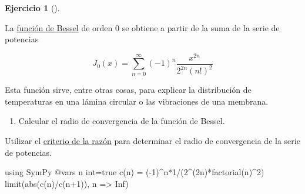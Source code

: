 \documentclass[
  a4paper,
]{scrreport}
\newenvironment{Shaded}{\begin{snugshade}}{\end{snugshade}}
\newcommand{\BuiltInTok}[1]{\textcolor[rgb]{0.00,0.23,0.31}{#1}}
\newcommand{\ConstantTok}[1]{\textcolor[rgb]{0.56,0.35,0.01}{#1}}
\newcommand{\FloatTok}[1]{\textcolor[rgb]{0.68,0.00,0.00}{#1}}
\newcommand{\FunctionTok}[1]{\textcolor[rgb]{0.28,0.35,0.67}{#1}}
\newcommand{\ImportTok}[1]{\textcolor[rgb]{0.00,0.46,0.62}{#1}}
\newcommand{\NormalTok}[1]{\textcolor[rgb]{0.00,0.23,0.31}{#1}}
\newcommand{\OperatorTok}[1]{\textcolor[rgb]{0.37,0.37,0.37}{#1}}
\newcommand{\PreprocessorTok}[1]{\textcolor[rgb]{0.68,0.00,0.00}{#1}}
\providecommand{\tightlist}{%
  \setlength{\itemsep}{0pt}\setlength{\parskip}{0pt}}\usepackage{longtable,booktabs,array}
\theoremstyle{definition}
\newtheorem{exercise}{Ejercicio}[chapter]
\theoremstyle{remark}
\begin{document}
\leavevmode{}%
\begin{exercise}[]\label{exr-serie-bessel}

La \href{https://es.wikipedia.org/wiki/Funci\%C3\%B3n_de_Bessel}{función
de Bessel} de orden 0 se obtiene a partir de la suma de la serie de
potencias

\[
J_0(x) = \sum_{n=0}^\infty (-1)^n\frac{x^{2n}}{2^{2n}(n!)^2}
\]

Esta función sirve, entre otras cosas, para explicar la distribución de
temperaturas en una lámina circular o las vibraciones de una membrana.

\begin{enumerate}
\def\labelenumi{\alph{enumi}.}
\tightlist
\item
  Calcular el radio de convergencia de la función de Bessel.
\end{enumerate}

\begin{tcolorbox}[enhanced jigsaw, toptitle=1mm, colframe=quarto-callout-note-color-frame, opacitybacktitle=0.6, colback=white, titlerule=0mm, toprule=.15mm, arc=.35mm, coltitle=black, colbacktitle=quarto-callout-note-color!10!white, bottomtitle=1mm, bottomrule=.15mm, title=\textcolor{quarto-callout-note-color}{\faInfo}\hspace{0.5em}{Ayuda}, rightrule=.15mm, opacityback=0, leftrule=.75mm, left=2mm, breakable]

Utilizar el
\href{https://aprendeconalf.es/analisis-manual/08-series.html\#thm-radio-convergencia-razon}{criterio
de la razón} para determinar el radio de convergencia de la serie de
potencias.

\end{tcolorbox}

\begin{tcolorbox}[enhanced jigsaw, toptitle=1mm, colframe=quarto-callout-tip-color-frame, opacitybacktitle=0.6, colback=white, titlerule=0mm, toprule=.15mm, arc=.35mm, coltitle=black, colbacktitle=quarto-callout-tip-color!10!white, bottomtitle=1mm, bottomrule=.15mm, title=\textcolor{quarto-callout-tip-color}{\faLightbulb}\hspace{0.5em}{Solución}, rightrule=.15mm, opacityback=0, leftrule=.75mm, left=2mm, breakable]

\begin{Shaded}
\begin{Highlighting}[]
\ImportTok{using} \BuiltInTok{SymPy}
\PreprocessorTok{@vars}\NormalTok{ n int}\OperatorTok{=}\ConstantTok{true}
\FunctionTok{c}\NormalTok{(n) }\OperatorTok{=}\NormalTok{ (}\OperatorTok{{-}}\FloatTok{1}\NormalTok{)}\OperatorTok{\^{}}\NormalTok{n}\OperatorTok{*}\FloatTok{1}\OperatorTok{/}\NormalTok{(}\FloatTok{2}\OperatorTok{\^{}}\NormalTok{(}\FloatTok{2}\NormalTok{n)}\FunctionTok{*factorial}\NormalTok{(n)}\OperatorTok{\^{}}\FloatTok{2}\NormalTok{)}
\FunctionTok{limit}\NormalTok{(}\FunctionTok{abs}\NormalTok{(}\FunctionTok{c}\NormalTok{(n)}\OperatorTok{/}\FunctionTok{c}\NormalTok{(n}\OperatorTok{+}\FloatTok{1}\NormalTok{)), n }\OperatorTok{=\textgreater{}} \ConstantTok{Inf}\NormalTok{)}
\end{Highlighting}
\end{Shaded}


\end{tcolorbox}
\end{exercise}
\end{document}
